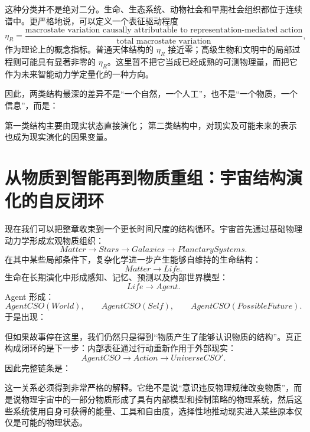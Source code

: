 这种分类并不是绝对二分。生命、生态系统、动物社会和早期社会组织都位于连续谱中。更严格地说，可以定义一个表征驱动程度
\[
\eta_R
=
\frac{
\text{macrostate variation causally attributable to representation-mediated action}
}{
\text{total macrostate variation}
},
\]
作为理论上的概念指标。普通天体结构的 $\eta_R$ 接近零；高级生物和文明中的局部过程则可能具有显著非零的 $\eta_R$。这里暂不把它当成已经成熟的可测物理量，而把它作为未来智能动力学定量化的一种方向。

因此，两类结构最深的差异不是“一个自然，一个人工”，也不是“一个物质，一个信息”，而是：

\begin{statementbox}
第一类结构主要由现实状态直接演化；
第二类结构中，对现实及可能未来的表示也成为现实演化的因果变量。
\end{statementbox}

\section{从物质到智能再到物质重组：宇宙结构演化的自反闭环}

现在我们可以把整章收束到一个更长时间尺度的结构循环。宇宙首先通过基础物理动力学形成宏观物质组织：
\[
Matter
\rightarrow
Stars
\rightarrow
Galaxies
\rightarrow
PlanetarySystems.
\]
在其中某些局部条件下，复杂化学进一步产生能够自维持的生命结构：
\[
Matter
\rightarrow
Life.
\]
生命在长期演化中形成感知、记忆、预测以及内部世界模型：
\[
Life
\rightarrow
Agent.
\]
Agent 形成：
\[
AgentCSO(World),
\qquad
AgentCSO(Self),
\qquad
AgentCSO(PossibleFuture).
\]
于是出现：
\begin{statementbox}
\centering
{}
\end{statementbox}

但如果故事停在这里，我们仍然只是得到“物质产生了能够认识物质的结构”。真正构成闭环的是下一步：内部表征通过行动重新作用于外部现实：
\[
AgentCSO
\rightarrow
Action
\rightarrow
UniverseCSO'.
\]
因此完整链条是：
\begin{statementbox}
\centering
{}
\end{statementbox}

这一关系必须得到非常严格的解释。它绝不是说“意识违反物理规律改变物质”，而是说物理宇宙中的一部分物质形成了具有内部模型和控制策略的物理系统，然后这些系统使用自身可获得的能量、工具和自由度，选择性地推动现实进入某些原本仅仅是可能的物理状态。

